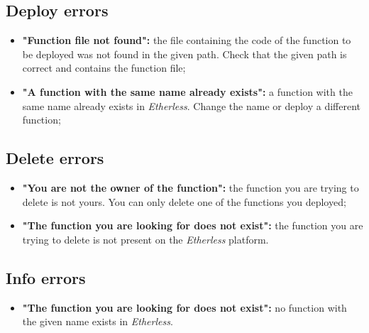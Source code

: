   \subsection{Deploy errors}
  \begin{itemize}
    \item \textbf{"Function file not found":} the file containing the code of the function to be deployed was not found in the given path. Check that the given path is correct and contains the function file;
    \item \textbf{"A function with the same name already exists":} a function with the same name already exists in \textit{Etherless}. Change the name or deploy a different function;
  \end{itemize}
  \subsection{Delete errors}
  \begin{itemize}
    \item \textbf{"You are not the owner of the function":} the function you are trying to delete is not yours. You can only delete one of the functions you deployed;
    \item \textbf{"The function you are looking for does not exist":} the function you are trying to delete is not present on the \textit{Etherless} platform.
  \end{itemize}
  \subsection{Info errors}
  \begin{itemize}
    \item \textbf{"The function you are looking for does not exist":} no function with the given name exists in \textit{Etherless}.
  \end{itemize}
